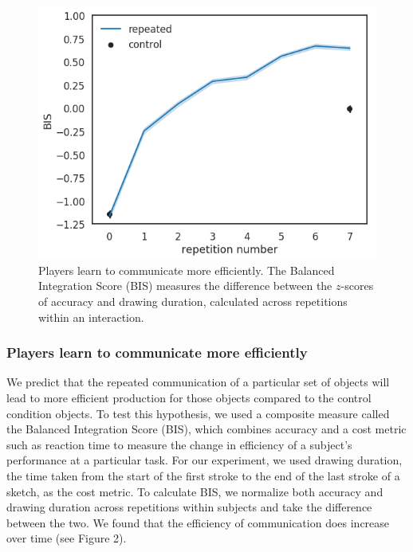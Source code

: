 \documentclass[10pt,letterpaper]{article}
\begin{document}
\begin{figure}
\includegraphics[width=\linewidth]{figures/fig_2.png}
\caption{Players learn to communicate more efficiently. The Balanced Integration Score (BIS) measures the difference between the $z$-scores of accuracy and drawing duration, calculated across repetitions within an interaction.} \label{fig:1a}
\end{figure}

\subsubsection{Players learn to communicate more efficiently} We predict that the repeated communication of a particular set of objects will lead to more efficient production for those objects compared to the control condition objects. To test this hypothesis, we used a composite measure called the Balanced Integration Score (BIS), which combines accuracy and a cost metric such as reaction time to measure the change in efficiency of a subject's performance at a particular task. For our experiment, we used drawing duration, the time taken from the start of the first stroke to the end of the last stroke of a sketch, as the cost metric. To calculate BIS, we normalize both accuracy and drawing duration across repetitions within subjects and take the difference between the two. We found that the efficiency of communication does increase over time (see Figure 2). 
\end{document}
